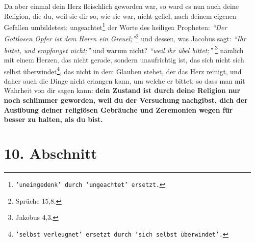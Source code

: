 \medskip

Da aber einmal dein Herz fleischlich geworden war, so ward es nun auch deine
Religion, die du, weil sie dir so, wie sie war, nicht gefiel, nach deinem
eigenen Gefallen umbildetest; ungeachtet\footnote{\texttt{'uneingedenk' durch
'ungeachtet' ersetzt.}}
der Worte des heiligen Propheten:
\textit{"`Der Gottlosen Opfer ist dem Herrn ein Greuel;"'}\footnote{Sprüche
15,8.}
 und
dessen, was Jacobus sagt:
\textit{"`Ihr bittet, und empfanget nicht;"'} und warum
nicht? \textit{"`weil ihr übel bittet;"'}
\footnote{Jakobus 4,3.}
 nämlich mit einem
Herzen, das nicht gerade, sondern unaufrichtig ist, das sich nicht sich
selbst überwindet\footnote{\texttt{'selbst verleugnet' ersetzt durch 'sich
selbst überwindet'.}},
das nicht in dem Glauben stehet, der das Herz reinigt,
und daher
auch die Dinge nicht erlangen kann, um welche er bittet; so dass man mit
Wahrheit von dir sagen kann: \label{ref:02_09_selbstueberschaetzung}
\textbf{dein Zustand ist durch deine Religion nur noch
schlimmer geworden, weil du der Versuchung nachgibst, dich der Ausübung
deiner religiösen Gebräuche und Zeremonien wegen für besser zu halten, als du
bist.}

\section{10. Abschnitt}  \label{kap2_ab10}

